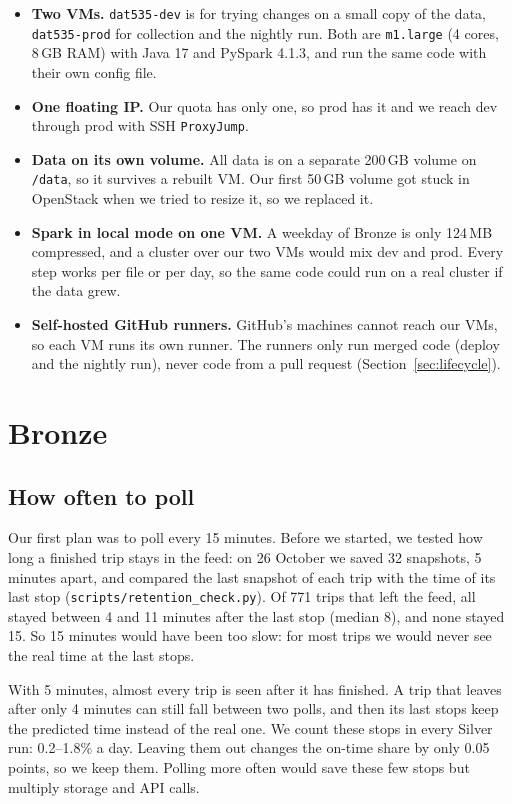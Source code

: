 \documentclass[11pt,a4paper]{article}
\newcommand{\code}[1]{\texttt{#1}}
\begin{document}
\begin{itemize}
  \item \textbf{Two VMs.} \code{dat535-dev} is for trying changes on a small copy of the data,
        \code{dat535-prod} for collection and the nightly run. Both are \code{m1.large}
        (4 cores, 8\,GB RAM) with Java 17 and PySpark 4.1.3, and run the same code with their
        own config file.
  \item \textbf{One floating IP.} Our quota has only one, so prod has it and we reach dev
        through prod with SSH \code{ProxyJump}.
  \item \textbf{Data on its own volume.} All data is on a separate 200\,GB volume on
        \code{/data}, so it survives a rebuilt VM. Our first 50\,GB volume got stuck in
        OpenStack when we tried to resize it, so we replaced it.
  \item \textbf{Spark in local mode on one VM.} A weekday of Bronze is only 124\,MB compressed,
        and a cluster over our two VMs would mix dev and prod. Every step works per file or per
        day, so the same code could run on a real cluster if the data grew.
  \item \textbf{Self-hosted GitHub runners.} GitHub's machines cannot reach our VMs, so each
        VM runs its own runner. The runners only run merged code (deploy and the nightly run),
        never code from a pull request (Section~\ref{sec:lifecycle}).
  \end{itemize}


\section{Bronze}
\label{sec:bronze}

\subsection*{How often to poll}

Our first plan was to poll every 15 minutes. Before we started, we tested how long a finished
trip stays in the feed: on 26 October we saved 32 snapshots, 5 minutes apart, and compared the
last snapshot of each trip with the time of its last stop (\code{scripts/retention\_check.py}).
Of 771 trips that left the feed, all stayed between 4 and 11 minutes after the last stop
(median 8), and none stayed 15. So 15 minutes would have been too slow: for most trips we would
never see the real time at the last stops.

With 5 minutes, almost every trip is seen after it has finished. A trip that leaves after only
4 minutes can still fall between two polls, and then its last stops keep the predicted time
instead of the real one. We count these stops in every Silver run: 0.2--1.8\% a day. Leaving
them out changes the on-time share by only 0.05 points, so we keep them. Polling more often
would save these few stops but multiply storage and API calls.
\end{document}
